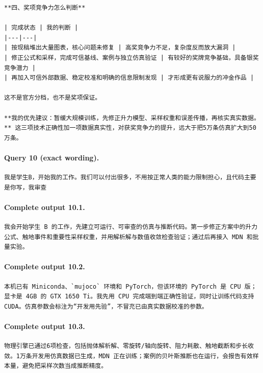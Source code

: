 \documentclass[UTF8,10pt]{ctexart}
\begin{document}
\begin{Verbatim}[breaklines=true,breakanywhere=true,fontsize=\scriptsize,frame=single,framesep=2pt]
**四、奖项竞争力怎么判断**

| 完成状态 | 我的判断 |
|---|---|
| 按现稿堆出大量图表，核心问题未修复 | 高奖竞争力不足，复杂度反而放大漏洞 |
| 修正公式和采样，完成可信基线、案例与独立仿真验证 | 有较好的奖牌竞争基础，具备银奖竞争潜力 |
| 再加入可信外部数据、稳定校准和明确的信息限制发现 | 才形成更有说服力的冲金作品 |

这不是官方分档，也不是奖项保证。

**我的优先建议：暂缓大规模训练，先修正升力模型、采样权重和误差传播，再核实真实数据。** 这三项技术正确性加一项数据真实性，对获奖竞争力的提升，远大于把5万条仿真扩大到50万条。
\end{Verbatim}

\paragraph{Query 10 (exact wording).}
\begin{Verbatim}[breaklines=true,breakanywhere=true,fontsize=\scriptsize,frame=single,framesep=2pt]
我是学生B，开始我的工作。我们可以付出很多，不用按正常人类的能力限制担心，且代码主要是你写，我审查
\end{Verbatim}

\paragraph{Complete output 10.1.}
\begin{Verbatim}[breaklines=true,breakanywhere=true,fontsize=\scriptsize,frame=single,framesep=2pt]
我会开始学生 B 的工作，先建立可运行、可审查的仿真与推断代码。第一步修正方案中的升力公式、触地事件和重要性采样权重，并用解析解与数值收敛检查验证；通过后再接入 MDN 和批量实验。
\end{Verbatim}

\paragraph{Complete output 10.2.}
\begin{Verbatim}[breaklines=true,breakanywhere=true,fontsize=\scriptsize,frame=single,framesep=2pt]
本机已有 Miniconda、`mujoco` 环境和 PyTorch，但该环境的 PyTorch 是 CPU 版；显卡是 4GB 的 GTX 1650 Ti。我先用 CPU 完成端到端正确性验证，同时让训练代码支持 CUDA。仿真参数会标注为“开发用先验”，不冒充已由真实数据校准的参数。
\end{Verbatim}

\paragraph{Complete output 10.3.}
\begin{Verbatim}[breaklines=true,breakanywhere=true,fontsize=\scriptsize,frame=single,framesep=2pt]
物理引擎已通过6项检查，包括抛体解析解、零旋转/轴向旋转、阻力耗散、触地截断和步长收敛。1万条开发用仿真数据已生成，MDN 正在训练；案例的贝叶斯推断也在运行，会报告有效样本量，避免把采样次数当成推断精度。
\end{Verbatim}
\end{document}
